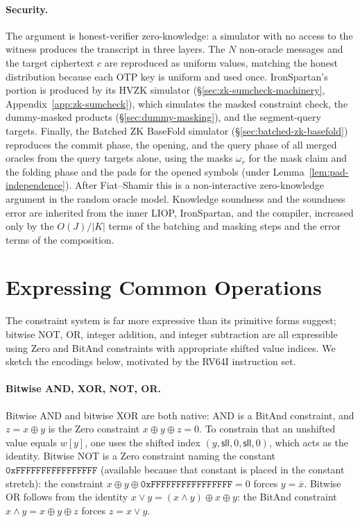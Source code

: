 \documentclass{article}
\theoremstyle{definition}
\begin{document}
\paragraph{Security.}
The argument is honest-verifier zero-knowledge: a simulator with no access to the witness produces the transcript in three layers. The $N$ non-oracle messages and the target ciphertext $c$ are reproduced as uniform values, matching the honest distribution because each OTP key is uniform and used once. IronSpartan's portion is produced by its HVZK simulator (\S\ref{sec:zk-sumcheck-machinery}, Appendix~\ref{app:zk-sumcheck}), which simulates the masked constraint check, the dummy-masked products (\S\ref{sec:dummy-masking}), and the segment-query targets. Finally, the Batched ZK BaseFold simulator (\S\ref{sec:batched-zk-basefold}) reproduces the commit phase, the opening, and the query phase of all merged oracles from the query targets alone, using the masks $\omega_r$ for the mask claim and the folding phase and the pads for the opened symbols (under Lemma~\ref{lem:pad-independence}). After Fiat--Shamir this is a non-interactive zero-knowledge argument in the random oracle model. Knowledge soundness and the soundness error are inherited from the inner LIOP, IronSpartan, and the compiler, increased only by the $O(J) / |K|$ terms of the batching and masking steps and the error terms of the composition.

\appendix

\section{Expressing Common Operations}
\label{sec:common-ops}

The constraint system is far more expressive than its primitive forms suggest; bitwise NOT, OR, integer addition, and integer subtraction are all expressible using Zero and BitAnd constraints with appropriate shifted value indices. We sketch the encodings below, motivated by the RV64I instruction set.

\paragraph{Bitwise AND, XOR, NOT, OR.}
Bitwise AND and bitwise XOR are both native: AND is a BitAnd constraint, and $z = x \oplus y$ is the Zero constraint $x \oplus y \oplus z = 0$. To constrain that an unshifted value equals $w[y]$, one uses the shifted index $(y, \textsf{sll}, 0, \textsf{sll}, 0)$, which acts as the identity. Bitwise NOT is a Zero constraint naming the constant $\texttt{0xFFFFFFFFFFFFFFFF}$ (available because that constant is placed in the constant stretch): the constraint $x \oplus y \oplus \texttt{0xFFFFFFFFFFFFFFFF} = 0$ forces $y = \overline{x}$. Bitwise OR follows from the identity $x \lor y = (x \land y) \oplus x \oplus y$: the BitAnd constraint $x \land y = x \oplus y \oplus z$ forces $z = x \lor y$.
\end{document}
